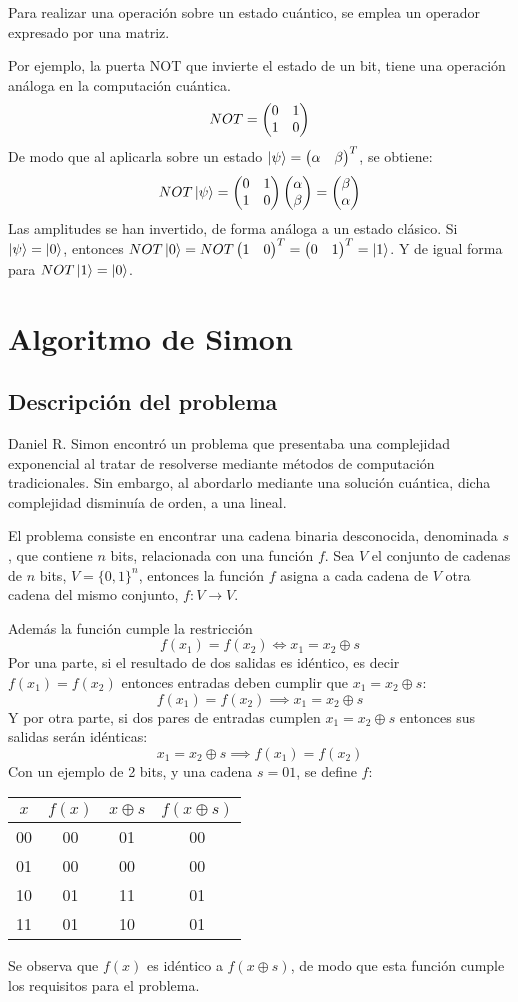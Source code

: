 Para realizar una operación sobre un estado cuántico, se emplea un operador 
expresado por una matriz.

Por ejemplo, la puerta NOT que invierte el estado de un bit, tiene una operación 
análoga en la computación cuántica.
%
$$ NOT = \begin{pmatrix} 0 & 1 \\ 1 & 0 \end{pmatrix} $$
%
De modo que al aplicarla sobre un estado $\ket{\psi} = \begin{pmatrix} \alpha & \beta \end{pmatrix}^T$, 
se obtiene:
%
$$ NOT \ket{\psi} = \begin{pmatrix} 0 & 1 \\ 1 & 0 \end{pmatrix} \begin{pmatrix} \alpha \\ \beta \end{pmatrix} = \begin{pmatrix} \beta \\ 
\alpha \end{pmatrix} $$
%
Las amplitudes se han invertido, de forma análoga a un estado clásico. Si 
$\ket{\psi} = \ket{0}$, entonces $NOT\ket{0} = NOT \begin{pmatrix} 1 & 0 \end{pmatrix}^T = \begin{pmatrix} 0 & 
1 \end{pmatrix}^T = \ket{1}$. Y de igual forma para $NOT \ket{1} = \ket{0}$.

\newpage
\section{Algoritmo de Simon}
\subsection{Descripción del problema}

Daniel R. Simon encontró un problema que presentaba una complejidad exponencial 
al tratar de resolverse mediante métodos de computación tradicionales. Sin 
embargo, al abordarlo mediante una solución cuántica, dicha complejidad 
disminuía de orden, a una lineal.

El problema consiste en encontrar una cadena binaria desconocida, denominada 
$s$, que contiene $n$ bits, relacionada con una función $f$. Sea $V$ el conjunto 
de cadenas de $n$ bits, $V = \{0,1\}^n$, entonces la función $f$ asigna a cada 
cadena de $V$ otra cadena del mismo conjunto, $f:V \rightarrow V$.

Además la función cumple la restricción
%
\begin{equation}
	\label{eq:simon_f}
	f(x_1) = f(x_2) \iff x_1 = x_2 \oplus s
\end{equation}
%
Por una parte, si el resultado de dos salidas es idéntico, es decir $f(x_1) = 
f(x_2)$ entonces entradas deben cumplir que $x_1 = x_2 \oplus s$:
%
$$ f(x_1) = f(x_2) \implies x_1 = x_2 \oplus s $$
%
Y por otra parte, si dos pares de entradas cumplen $x_1 = x_2 \oplus s$ entonces 
sus salidas serán idénticas:
%
$$ x_1 = x_2 \oplus s \implies f(x_1) = f(x_2) $$
%
Con un ejemplo de 2 bits, y una cadena $s = 01$, se define $f$:
%
\begin{center}
\begin{tabular}{|c|c||c|c|}
	\hline
	$x$ & $f(x)$ & $x \oplus s$ & $f(x \oplus s)$\\
	\hline
	00 & 00 & 01 & 00\\
	01 & 00 & 00 & 00\\
	10 & 01 & 11 & 01\\
	11 & 01 & 10 & 01\\
	\hline
\end{tabular}
\end{center}
%
Se observa que $f(x)$ es idéntico a $f(x \oplus s)$, de modo que esta función 
cumple los requisitos para el problema.

